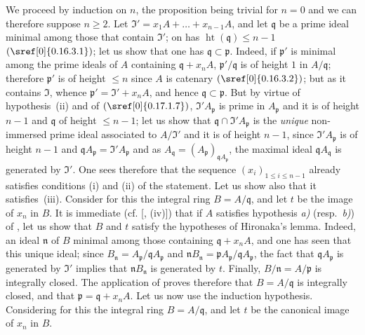 We proceed by induction on $n$, the proposition being trivial for $n=0$ and we can therefore suppose $n\geqslant 2$.
Let $\mathfrak{I}'=x_1A+\ldots+x_{n-1}A$, and let $\mathfrak{q}$ be a prime ideal minimal among those that contain $\mathfrak{I}'$; on has $\operatorname{ht}(\mathfrak{q})\leqslant n-1$ $(\sref[0]{0.16.3.1})$; let us show that one has $\mathfrak{q}\subset\mathfrak{p}$.
Indeed, if $\mathfrak{p}'$ is minimal among the prime ideals of $A$ containing $\mathfrak{q}+x_nA$, $\mathfrak{p}'/\mathfrak{q}$ is of height $1$ in $A/\mathfrak{q}$; therefore $\mathfrak{p}'$ is of height $\leqslant n$ since $A$ is catenary $(\sref[0]{0.16.3.2})$; but as it contains $\mathfrak{I}$, whence $\mathfrak{p}'=\mathfrak{I}'+x_nA$, and hence $\mathfrak{q}\subset\mathfrak{p}$.
But by virtue of hypothesis~(ii) and of $(\sref[0]{0.17.1.7})$, $\mathfrak{I}'A_\mathfrak{p}$ is prime in $A_\mathfrak{p}$ and it is of height $n-1$ and $\mathfrak{q}$ of height $\leqslant n-1$; let us show that $\mathfrak{q}\cap\mathfrak{I}'A_\mathfrak{p}$ is the \emph{unique} non-immersed prime ideal associated to $A/\mathfrak{I}'$ and it is of height $n-1$, since $\mathfrak{I}'A_\mathfrak{p}$ is of height $n-1$ and $\mathfrak{q}A_\mathfrak{p}=\mathfrak{I}'A_\mathfrak{p}$ and as $A_\mathfrak{q}=(A_\mathfrak{p})_{\mathfrak{q}A_\mathfrak{p}}$, the maximal ideal $\mathfrak{q}A_\mathfrak{q}$ is generated by $\mathfrak{I}'$.
One sees therefore that the sequence $(x_i)_{1\leqslant i\leqslant n-1}$ already satisfies conditions (i) and (ii) of the statement.
Let us show also that it satisfies~(iii).
Consider for this the integral ring $B=A/\mathfrak{q}$, and let $t$ be the image of $x_n$ in $B$.
It is immediate (cf. [, (iv)]) that if $A$ satisfies hypothesis \emph{a)} (resp.\ \emph{b)}) of , let us show that $B$ and $t$ satisfy the hypotheses of Hironaka's lemma.
Indeed, an ideal $\mathfrak{n}$ of $B$ minimal among those containing $\mathfrak{q}+x_nA$, and one has seen that this unique ideal; since $B_\mathfrak{n}=A_\mathfrak{p}/\mathfrak{q}A_\mathfrak{p}$ and $\mathfrak{n}B_\mathfrak{n}=\mathfrak{p}A_\mathfrak{p}/\mathfrak{q}A_\mathfrak{p}$, the fact that $\mathfrak{q}A_\mathfrak{p}$ is generated by $\mathfrak{I}'$ implies that $\mathfrak{n}B_\mathfrak{n}$ is generated by $t$.
Finally, $B/\mathfrak{n}=A/\mathfrak{p}$ is integrally closed.
The application of  proves therefore that $B=A/\mathfrak{q}$ is integrally closed, and that $\mathfrak{p}=\mathfrak{q}+x_nA$.
Let us now use the induction hypothesis.
Considering for this the integral ring $B=A/\mathfrak{q}$, and let $t$ be the canonical image of $x_n$ in $B$.
